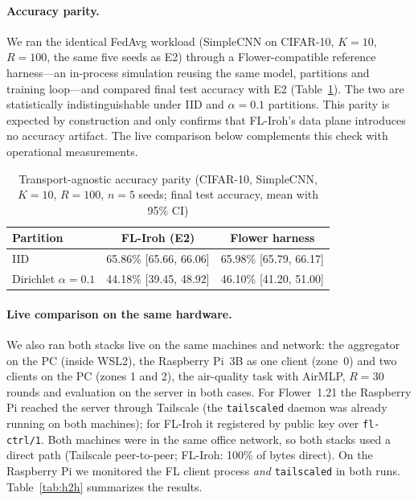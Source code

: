 \paragraph{Accuracy parity.} We ran the identical FedAvg workload (SimpleCNN on CIFAR-10, $K{=}10$, $R{=}100$, the same five seeds as E2) through a Flower-compatible reference harness---an in-process simulation reusing the same model, partitions and training loop---and compared final test accuracy with E2 (Table~\ref{tab:e7acc}). The two are statistically indistinguishable under IID and $\alpha{=}0.1$ partitions. This parity is expected by construction and only confirms that FL-Iroh's data plane introduces no accuracy artifact. The live comparison below complements this check with operational measurements.

\begin{table}[t]
\centering
\caption{Transport-agnostic accuracy parity (CIFAR-10, SimpleCNN, $K{=}10$, $R{=}100$, $n{=}5$ seeds; final test accuracy, mean with 95\% CI)}
\label{tab:e7acc}
\scriptsize
\renewcommand{\arraystretch}{1.25}
\setlength{\tabcolsep}{3.5pt}
\begin{tabular}{l c c}
\toprule
\textbf{Partition} & \textbf{FL-Iroh (E2)} & \textbf{Flower harness} \\
\midrule
IID                      & 65.86\% [65.66, 66.06] & 65.98\% [65.79, 66.17] \\
Dirichlet $\alpha{=}0.1$ & 44.18\% [39.45, 48.92] & 46.10\% [41.20, 51.00] \\
\bottomrule
\end{tabular}
\end{table}

\paragraph{Live comparison on the same hardware.} We also ran both stacks live on the same machines and network: the aggregator on the PC (inside WSL2), the Raspberry Pi~3B as one client (zone~0) and two clients on the PC (zones 1 and 2), the air-quality task with AirMLP, $R{=}30$ rounds and evaluation on the server in both cases. For Flower~1.21 the Raspberry Pi reached the server through Tailscale (the \texttt{tailscaled} daemon was already running on both machines); for FL-Iroh it registered by public key over \texttt{fl-ctrl/1}. Both machines were in the same office network, so both stacks used a direct path (Tailscale peer-to-peer; FL-Iroh: 100\% of bytes direct). On the Raspberry Pi we monitored the FL client process \emph{and} \texttt{tailscaled} in both runs. Table~\ref{tab:h2h} summarizes the results.

